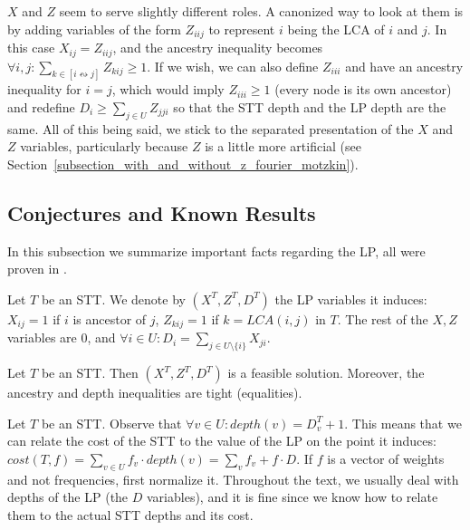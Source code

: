 \begin{remark}
\label{remark_lp_variables_all_viewed_as_LCA}
$X$ and $Z$ seem to serve slightly different roles. A canonized way to look at them is by adding variables of the form $Z_{iij}$ to represent $i$ being the LCA of $i$ and $j$. In this case $X_{ij} = Z_{iij}$, and the ancestry inequality becomes $\forall i,j: \sum_{k \in [i \leftrightsquigarrow j]}{Z_{kij}} \ge 1$. If we wish, we can also define $Z_{iii}$ and have an ancestry inequality for $i=j$, which would imply $Z_{iii} \ge 1$ (every node is its own ancestor) and redefine $D_i \ge \sum_{j \in U}{Z_{jji}}$ so that the STT depth and the LP depth are the same. All of this being said, we stick to the separated presentation of the $X$ and $Z$ variables, particularly because $Z$ is a little more artificial (see Section~\ref{subsection_with_and_without_z_fourier_motzkin}).
\end{remark}



\subsection{Conjectures and Known Results}
In this subsection we summarize important facts regarding the LP, all were proven in \cite{GolinskyThesis}.

\begin{definition}
\label{definition_xzd_of_stt}
Let $T$ be an STT. We denote by $(X^T,Z^T,D^T)$ the LP variables it induces: $X_{ij}=1$ if $i$ is ancestor of $j$, $Z_{kij}=1$ if $k = LCA(i,j)$ in $T$. The rest of the $X,Z$ variables are $0$, and $\forall i \in U: D_i = \sum_{j \in U\setminus \{ i \}}{X_{ji}}$.
\end{definition}

\begin{property}
\label{property_stt_feasible}
Let $T$ be an STT. Then $(X^T,Z^T,D^T)$ is a feasible solution. Moreover, the ancestry and depth inequalities are tight (equalities).
\end{property}

\begin{remark}
\label{remark_depth_off_by_one}
Let $T$ be an STT. Observe that $\forall v \in U: depth(v) = D^T_v + 1$. This means that we can relate the cost of the STT to the value of the LP on the point it induces: $cost(T,f) = \sum_{v \in U}{f_v \cdot depth(v)} = \sum_v{f_v} + f \cdot D$. If $f$ is a vector of weights and not frequencies, first normalize it. Throughout the text, we usually deal with depths of the LP (the $D$ variables), and it is fine since we know how to relate them to the actual STT depths and its cost.
\end{remark}



